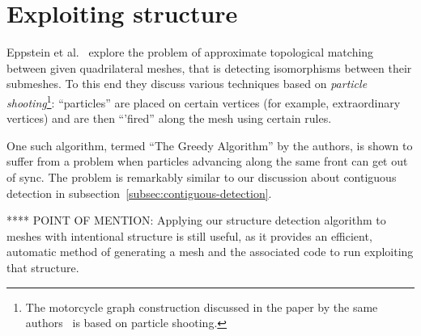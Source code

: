 \section{Exploiting structure}




Eppstein et al.~\cite{eppstein2008approximate} explore the problem of approximate topological matching between given quadrilateral meshes, that is detecting isomorphisms between their submeshes. To this end they discuss various techniques based on \emph{particle shooting}\footnote{The motorcycle graph construction discussed in the paper by the same authors~\cite{eppstein2008motorcycle} is based on particle shooting.}: ``particles'' are placed on certain vertices (for example, extraordinary vertices) and are then ``'fired'' along the mesh using certain rules.

One such algorithm, termed ``The Greedy Algorithm'' by the authors, is shown to suffer from a problem when particles advancing along the same front can get out of sync. The problem is remarkably similar to our discussion about contiguous detection in subsection~\ref{subsec:contiguous-detection}.









**** POINT OF MENTION:
Applying our structure detection algorithm to meshes with intentional structure is still useful, as it provides an efficient, automatic method of generating a mesh and the associated code to run exploiting that structure.
